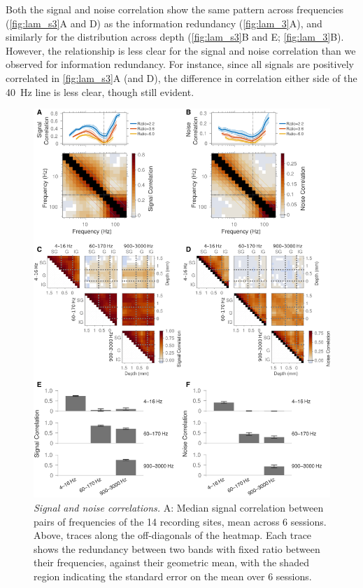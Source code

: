 Both the signal and noise correlation show the same pattern across frequencies (\autoref{fig:lam_s3}A and D) as the information redundancy (\autoref{fig:lam_3}A), and similarly for the distribution across depth (\autoref{fig:lam_s3}B and E; \autoref{fig:lam_3}B).
However, the relationship is less clear for the signal and noise correlation than we observed for information redundancy.
For instance, since all signals are positively correlated in \autoref{fig:lam_s3}A (and D), the difference in correlation either side of the \SI{40}{Hz} line is less clear, though still evident.


\begin{figure}
\centering \includegraphics[width=\columnwidth]{paperfigs/figS3}
%
\caption{%
\textit{Signal and noise correlations.}
A: Median signal correlation between pairs of frequencies of the 14 recording sites, mean across 6 sessions.
Above, traces along the off-diagonals of the heatmap.
Each trace shows the redundancy between two bands with fixed ratio between their frequencies, against their geometric mean, with the shaded region indicating the standard error on the mean over 6 sessions.
}
\end{figure}
